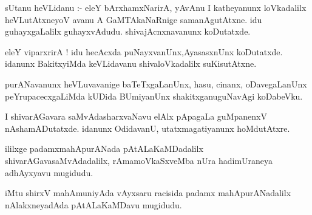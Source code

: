 \documentclass{article}
\begin{document}
\begin{mn}
sUtanu  heVLidanu :- eleY  bArxhamxNarirA,  yAvAnu  I  katheyanunx  loVkadalilx  heVLutAtxneyoV  avanu  A  GaMTAkaNaRnige  
samanAgutAtxne.  idu  guhayxgaLalilx  guhayxvAdudu.  shivajAcnxnavanunx  koDutatxde.
\end{mn}

\begin{mn}
eleY  viparxrirA !  idu  hecAcxda  puNayxvanUnx,AyasasxnUnx  koDutatxde.  idanunx  BakitxyiMda  keVLidavanu  shivaloVkadalilx  suKisutAtxne.
\end{mn}

\begin{mn}
purANavanunx  heVLuvavanige  baTeTxgaLanUnx,  hasu,  cinanx,  oDavegaLanUnx  peYrupacecxgaLiMda  kUDida  BUmiyanUnx  shakitxganuguNavAgi  koDabeVku.
\end{mn}

\begin{mn}
I  shivarAGavara  saMvAdasharxvaNavu  elAlx  pApagaLa  guMpanenxV  nAshamADutatxde.  idanunx  OdidavanU,  utatxmagatiyanunx  hoMdutAtxre.
\end{mn}

\begin{mn}
ililxge  padamxmahApurANada  pAtALaKaMDadalilx  shivarAGavasaMvAdadalilx,  rAmamoVkaSxveMba  nUra  hadimUraneya  adhAyxyavu  mugidudu.
\end{mn}

\begin{mn}
\end{mn}

\begin{mn}
iMtu  shirxV  mahAmuniyAda  vAyxsaru  racisida  padamx  mahApurANadalilx  nAlakxneyadAda  pAtALaKaMDavu  mugidudu.
\end{mn}

\begin{mn}

\end{mn}

\begin{mn}

\end{mn}

\begin{mn}

\end{mn}

\begin{mn}

\end{mn}
\end{document}
